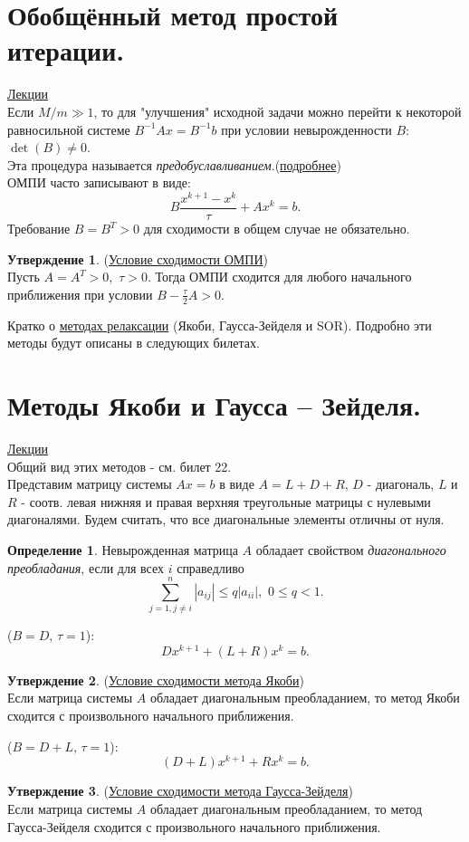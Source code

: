 \documentclass[specialist, subf, href, colorlinks=true, 12pt, times, mtpro, final]{disser}
\theoremstyle{definition}
\newtheorem{defn}{Определение}[section]
\newtheorem{state}{Утверждение}[section]
\begin{document}
{\section {Обобщённый метод простой итерации.}
    \hyperlink {lects.63}{Лекции}\\
    Если $M/m \gg 1$, то для "улучшения"{} исходной задачи можно перейти к некоторой равносильной системе $B^{-1}Ax = B^{-1}b$ при условии невырожденности $B$:
    $\det(B) \ne 0$.\\
    Эта процедура называется {\it предобуславливанием}.(\hyperlink {lects.63}{подробнее})\\
    ОМПИ часто записывают в виде:
    $$
        B\frac{x^{k+1} - x^{k}}{\tau} + Ax^{k} = b.
    $$
    Требование $B = B^T > 0$ для сходимости в общем случае не обязательно.
    \begin{state} (\hyperlink {lects.63}{Условие сходимости ОМПИ})\\
    Пусть $A = A^T > 0, \,\, \tau > 0$. Тогда ОМПИ сходится для любого начального
    приближения при условии $B - \frac{\tau}{2}A > 0$.
    \end{state}
    Кратко о \hyperlink {lects.64}{методах релаксации} (Якоби, Гаусса-Зейделя и SOR).
    Подробно эти методы будут описаны в следующих билетах.

\section {Методы Якоби и Гаусса -- Зейделя.}
    \hyperlink {lects.65}{Лекции}\\
    Общий вид этих методов - см. билет 22.\\
    Представим матрицу системы $Ax = b$ в виде $A = L + D + R$, $D$ - диагональ, $L$ и
    $R$ - соотв. левая нижняя и правая верхняя треугольные матрицы с нулевыми диагоналями.
    Будем считать, что все диагональные элементы отличны от нуля.
    \begin{defn}
    Невырожденная матрица $A$ обладает свойством {\it диагонального преобладания}, если для
    всех $i$ справедливо
    $$
        \sum_{j=1,j\ne i}^{n}|a_{ij}| \le q|a_{ii}|, \,\, 0 \le q < 1.
    $$
    \end{defn}
     ($B = D, \, \tau = 1$):
    $$
        Dx^{k+1} + (L+R)x^{k} = b.
    $$
    \begin{state} (\hyperlink {lects.65}{Условие сходимости метода Якоби})\\
    Если матрица системы $A$ обладает диагональным преобладанием, то метод Якоби сходится
    с произвольного начального приближения.
    \end{state}
     ($B = D + L, \, \tau = 1$):
    $$
        (D+L)x^{k+1} + Rx^{k} = b.
    $$
    \begin{state} (\hyperlink {lects.65}{Условие сходимости метода Гаусса-Зейделя})\\
    Если матрица системы $A$ обладает диагональным преобладанием, то метод Гаусса-Зейделя
    сходится с произвольного начального приближения.
    \end{state}

}
\end{document}
